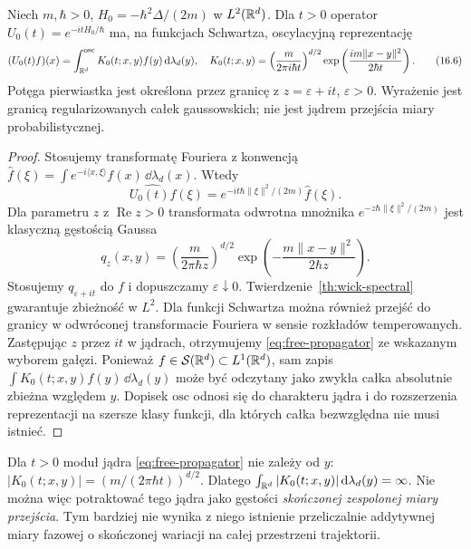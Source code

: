 \begin{twierdzenie}
\label{th:free-schrodinger-kernel}
Niech $m,\hbar>0$, $H_0=-\hbar^2\Delta/(2m)$ w
$L^2(\mathbb{R}^d)$. Dla $t>0$ operator
$U_0(t)=e^{-itH_0/\hbar}$ ma, na funkcjach Schwartza,
oscylacyjną reprezentację
\[
 (U_0(t)f)(x)=\int_{\mathbb{R}^d}^{\mathrm{osc}}
 K_0(t;x,y)f(y)\,\mathrm{d}\lambda_d(y),
\quad
 K_0(t;x,y)=\left(\frac{m}{2\pi i\hbar t}\right)^{d/2}
 \exp\left(\frac{im\|x-y\|^2}{2\hbar t}\right).
\tag{16.6}\label{eq:free-propagator}
\]
Potęga pierwiastka jest określona przez granicę z
$z=\varepsilon+it$, $\varepsilon>0$. Wyrażenie jest
granicą regularizowanych całek gaussowskich; nie jest
jądrem przejścia miary probabilistycznej.
\end{twierdzenie}
\begin{proof}
Stosujemy transformatę Fouriera z konwencją
$\widehat f(\xi)=\int e^{-i\langle x,\xi\rangle}
 f(x)\,\dd\lambda_d(x)$. Wtedy
\[
 \widehat{U_0(t)f}(\xi)
 =e^{-it\hbar\|\xi\|^2/(2m)}\widehat f(\xi).
\]
Dla parametru $z$ z $\operatorname{Re}z>0$
transformata odwrotna mnożnika
$e^{-z\hbar\|\xi\|^2/(2m)}$ jest klasyczną gęstością
Gaussa
\[
 q_z(x,y)=\left(\frac{m}{2\pi\hbar z}\right)^{d/2}
 \exp\left(-\frac{m\|x-y\|^2}{2\hbar z}\right).
\]
Stosujemy $q_{\varepsilon+it}$ do $f$ i dopuszczamy
$\varepsilon\downarrow0$. Twierdzenie~\ref{th:wick-spectral}
gwarantuje zbieżność w $L^2$. Dla funkcji Schwartza
można również przejść do granicy w odwróconej
transformacie Fouriera w sensie rozkładów temperowanych.
Zastępując $z$ przez $it$ w jądrach, otrzymujemy
\eqref{eq:free-propagator} ze wskazanym wyborem gałęzi.
Ponieważ $f\in\mathcal{S}(\mathbb{R}^d)\subset L^1(\mathbb{R}^d)$,
sam zapis $\int K_0(t;x,y)f(y)\,\dd\lambda_d(y)$
może być odczytany jako zwykła całka absolutnie zbieżna
względem $y$. Dopisek $\mathrm{osc}$ odnosi się do
charakteru jądra i do rozszerzenia reprezentacji na
szersze klasy funkcji, dla których całka bezwzględna
nie musi istnieć.
\end{proof}

\begin{uwaga}
Dla $t>0$ moduł jądra \eqref{eq:free-propagator}
nie zależy od $y$:
$|K_0(t;x,y)|=(m/(2\pi\hbar t))^{d/2}$.
Dlatego $\int_{\mathbb{R}^d}|K_0(t;x,y)|\,\mathrm{d}\lambda_d(y)=\infty$.
Nie można więc potraktować tego jądra jako gęstości
\emph{skończonej zespolonej miary przejścia}.
Tym bardziej nie wynika z niego istnienie przeliczalnie
addytywnej miary fazowej o skończonej wariacji na
całej przestrzeni trajektorii.
\end{uwaga}

